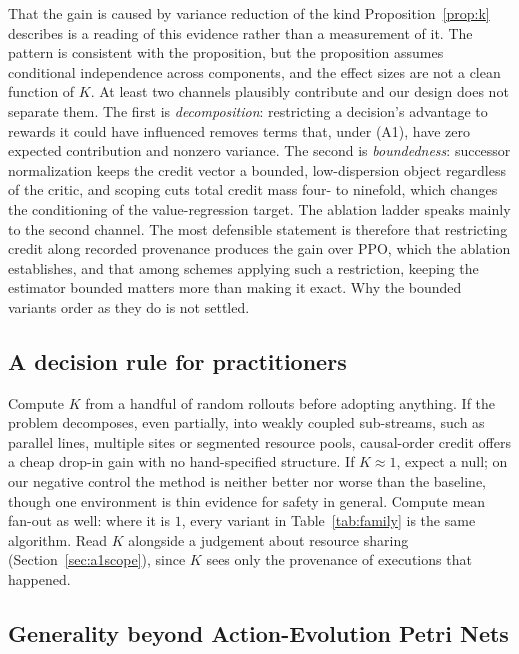 \documentclass[review,authoryear,3p,times]{elsarticle}
\begin{document}
That the gain is caused by variance reduction of the kind
Proposition~\ref{prop:k} describes is a reading of this evidence rather than a
measurement of it. The pattern is consistent with the proposition, but the
proposition assumes conditional independence across components, and the
effect sizes are not a clean function of $K$. At least two channels plausibly
contribute and our design does not separate them. The first is
\emph{decomposition}: restricting a decision's advantage to rewards it could
have influenced removes terms that, under (A1), have zero expected
contribution and nonzero variance. The second is \emph{boundedness}: successor
normalization keeps the credit vector a bounded, low-dispersion object
regardless of the critic, and scoping cuts total credit mass four- to
ninefold, which changes the conditioning of the value-regression target. The
ablation ladder speaks mainly to the second channel. The most defensible
statement is therefore that restricting credit along recorded provenance
produces the gain over PPO, which the ablation establishes, and that among
schemes applying such a restriction, keeping the estimator bounded matters more
than making it exact. Why the bounded variants order as they do is not
settled.

\subsection{A decision rule for practitioners}

Compute $K$ from a handful of random rollouts before adopting anything. If the
problem decomposes, even partially, into weakly coupled sub-streams, such as
parallel lines, multiple sites or segmented resource pools, causal-order credit
offers a cheap drop-in gain with no hand-specified structure. If $K\approx1$,
expect a null; on our negative control the method is neither better nor worse
than the baseline, though one environment is thin evidence for safety in
general. Compute mean fan-out as well: where it is $1$, every variant in
Table~\ref{tab:family} is the same algorithm. Read $K$ alongside a judgement
about resource sharing (Section~\ref{sec:a1scope}), since $K$ sees only the
provenance of executions that happened.

\subsection{Generality beyond Action-Evolution Petri Nets}
\label{sec:generality}
\end{document}
